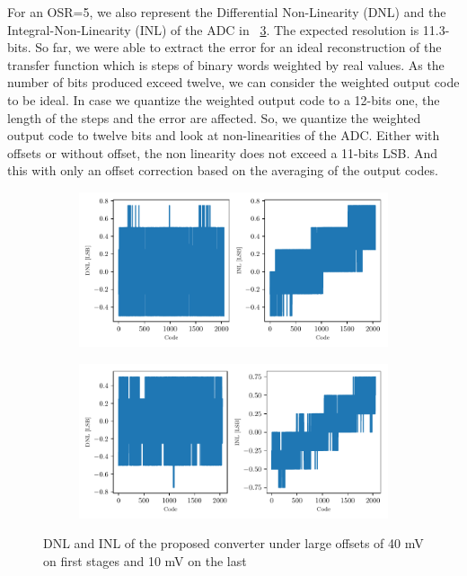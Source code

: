For an OSR=5, we also represent the Differential Non-Linearity (DNL) and the Integral-Non-Linearity (INL) of the ADC in \figurename~\ref{fig:adc-osr-dnl-inl}. The expected resolution is 11.3-bits. So far, we were able to extract the error for an ideal reconstruction of the transfer function which is steps of binary words weighted by real values. As the number of bits produced exceed twelve, we can consider the weighted output code to be ideal. In case we quantize the weighted output code to a 12-bits one, the length of the steps and the error are affected. So, we quantize the weighted output code to twelve bits and look at non-linearities of the ADC\@. Either with offsets or without offset, the non linearity does not exceed a 11-bits LSB\@. And this with only an offset correction based on the averaging of the output codes.

\begin{figure}[htp]
	\centering
	\begin{subfigure}[b]{0.8\textwidth}
		\centering
		\includegraphics[width=\textwidth]{Chapter4/Figs/results/adc/dnl-inl-osr5.pdf}
		\label{fig:adc-osr5-error-offset}
	\end{subfigure}
	\begin{subfigure}[b]{0.8\textwidth}
		\centering
		\includegraphics[width=\textwidth]{Chapter4/Figs/results/adc/dnl-inl-osr5-40mV-40mV-10mV.pdf}
		\label{fig:adc-osr6-error-offset}
	\end{subfigure}
	\caption{DNL and INL of the proposed converter under large offsets of 40 mV on first stages and 10 mV on the last}
	\label{fig:adc-osr-dnl-inl}
\end{figure}

